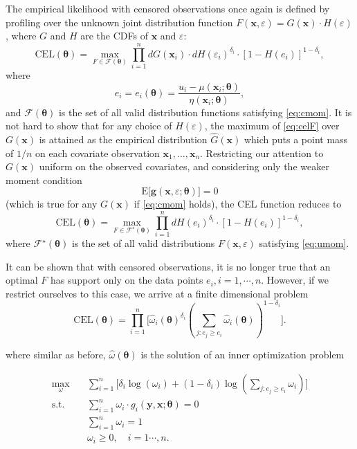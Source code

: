 \documentclass[article]{jss}
\renewcommand{\|}{\,|\,}
\begin{document}
The empirical likelihood with censored observations once again is defined by profiling over the unknown joint distribution function \(F(\bm x,\varepsilon) = G(\bm x) \cdot H(\varepsilon)\), where \(G\) and \(H\) are the CDFs of \(\bm x\) and \(\varepsilon\):
\begin{equation}\label{eq:celF}
  \textrm{CEL}(\bm \theta) = \max_{F \in \mathcal F(\bm \theta)}\prod_{i=1}^n dG(\bm x_i) \cdot dH(\varepsilon_i)^{\delta_i} \cdot [1- H(e_i)]^{1-\delta_i},
\end{equation}
where
\[
  e_i = e_i(\bm \theta) = \frac{u_i - \mu(\bm x_i;\bm \theta)}{\eta(\bm x_i;\bm \theta)},
\]
and \(\mathcal F(\bm \theta)\) is the set of all valid distribution functions satisfying \eqref{eq:cmom}. It is not hard to show that for any choice of \(H(\varepsilon)\), the maximum of \eqref{eq:celF} over \(G(\bm x)\) is attained as the empirical distribution \(\hat G(\bm x)\) which puts a point mass of \(1/n\) on each covariate observation \(\bm x_1, \ldots, \bm x_n\). Restricting our attention to \(G(\bm x)\) uniform on the observed covariates, and considering only the weaker moment condition
\begin{equation}\label{eq:umom}
  \textrm{E}\bigl[\bm g(\bm x, \varepsilon; \bm \theta)\bigr] = 0
\end{equation}
(which is true for any \(G(\bm x)\) if \eqref{eq:cmom} holds), the CEL function reduces to
\[
  \textrm{CEL}(\bm \theta) = \max_{F \in \mathcal F^\star(\bm \theta)}\prod_{i=1}^n dH(e_i)^{\delta_i} \cdot [1- H(e_i)]^{1-\delta_i},
\]
where \(\mathcal F^\star(\bm \theta)\) is the set of all valid distributions \(F(\bm x, \varepsilon)\) satisfying \eqref{eq:umom}.

It can be shown that with censored observations, it is no longer true that an optimal \(F\) has support only on the data points \(e_i, i=1,\cdots,n\). However, if we restrict ourselves to this case, we arrive at a finite dimensional problem
\begin{equation} \label{eq:elcens}
  \textrm{CEL}(\bm \theta) = \prod_{i=1}^n \Big[\hat \omega_i(\bm \theta)^{\delta_i}(\sum_{j: e_j \geq e_i}\hat \omega_i(\bm \theta))^{1-\delta_i}\Big].
\end{equation}

where similar as before, \(\hat\omega(\bm \theta)\) is the solution of an inner optimization problem

\begin{equation} \label{eq:elcens_inner}
\begin{split}
  \max_{\omega}\quad & \sum_{i=1}^n \Big[\delta_i\log(\omega_i) + (1-\delta_i)\log(\sum_{j: e_j\geq e_i}\omega_i)\Big]\\
  \text{s.t.}\quad & \sum_{i=1}^n \omega_i\cdot g_i(\bm y,\bm x;\bm \theta) = 0 \\
  & \sum_{i=1}^n \omega_i = 1 \\
  & \omega_i \geq 0, \quad i=1\cdots,n.
\end{split}
\end{equation}
\end{document}
